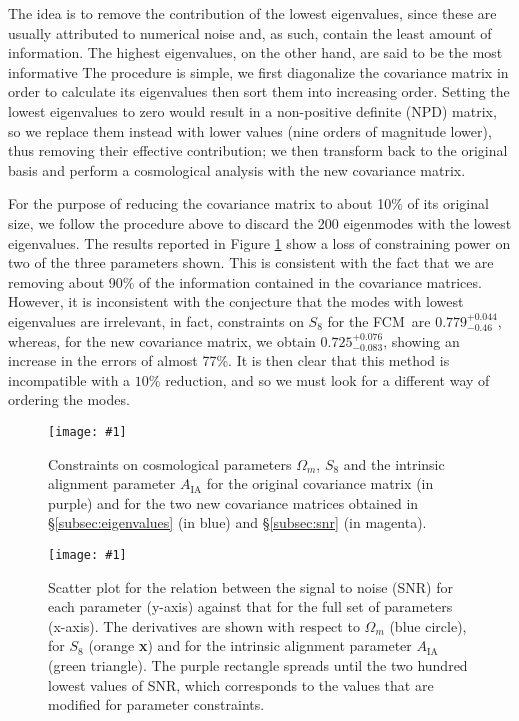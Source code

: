 \documentclass[twocolumn,nofootinbib]{\docclass}
\newcommand{\sfig}[2]{
	\texttt{[image: \#1]}
}
\newcommand{\Sfig}[3]{
	\begin{figure}[#1]
		\sfig{../figures/#2.pdf}{\columnwidth}
		\caption{#3}
		\label{fig:#2}
	\end{figure}
}
\newcommand{\Swide}[3]{
	\begin{figure*}[#1]
		\sfig{../figures/#2.pdf}{\textwidth}
		\caption{#3}
		\label{fig:#2}
	\end{figure*}
}
\newcommand{\rf}[1]{Figure \ref{fig:#1}}
\newcommand{\rssec}[1]{\S\ref{subsec:#1}}
\newcommand\full{the FCM}
\begin{document}
The idea is to remove the contribution of the lowest eigenvalues, since these are usually attributed to numerical noise and, as such, contain the least amount of information. The highest eigenvalues, on the other hand, are said to be the most informative \cite{Vogeley:1996} The procedure is simple, we first diagonalize the covariance matrix in order to calculate its eigenvalues then sort them into increasing order. Setting the lowest eigenvalues to zero would result in a non-positive definite (NPD) matrix, so we replace them instead with lower values (nine orders of magnitude lower), thus removing their effective contribution; we then transform back to the original basis and perform a cosmological analysis with the new covariance matrix.

For the purpose of reducing the covariance matrix to about 10\% of its original size, we follow the procedure above to discard the 200 eigenmodes with the lowest eigenvalues. The results reported in \rf{EigSNR-constraints_wmS8A} show a loss of constraining power on two of the three parameters shown. This is consistent with the fact that we are removing about 90\% of the information contained in the covariance matrices. However, it is inconsistent with the conjecture that the modes with lowest eigenvalues are irrelevant, in fact, constraints on $S_8$ for \full\ are $0.779^{+ 0.044}_{- 0.46}$, whereas, for the new covariance matrix, we obtain $0.725^{+ 0.076}_{- 0.083}$, showing an increase in the errors of almost 77\%. It is then clear that this method is incompatible with a $10\%$ reduction, and so we must look for a different way of ordering the modes.

\Sfig{thbp}{EigSNR-constraints_wmS8A}{Constraints on cosmological parameters $\Omega_m$, $S_8$ and the intrinsic alignment parameter $A_{\text{IA}}$ for the original covariance matrix (in purple) and for the two new covariance matrices obtained in \rssec{eigenvalues} (in blue) and \rssec{snr} (in magenta).}

\Swide{thbp}{SNR_cuts200}{Scatter plot for the relation between the signal to noise (SNR)  for each parameter (y-axis) against that for the full set of parameters (x-axis). The derivatives are shown with respect to $\Omega_m$ (blue circle), for $S_8$ (orange \textbf{x}) and for the intrinsic alignment parameter $A_{\text{IA}}$ (green triangle). The purple rectangle spreads until the two hundred lowest values of SNR, which corresponds to the values that are modified for parameter constraints.}

\end{document}
